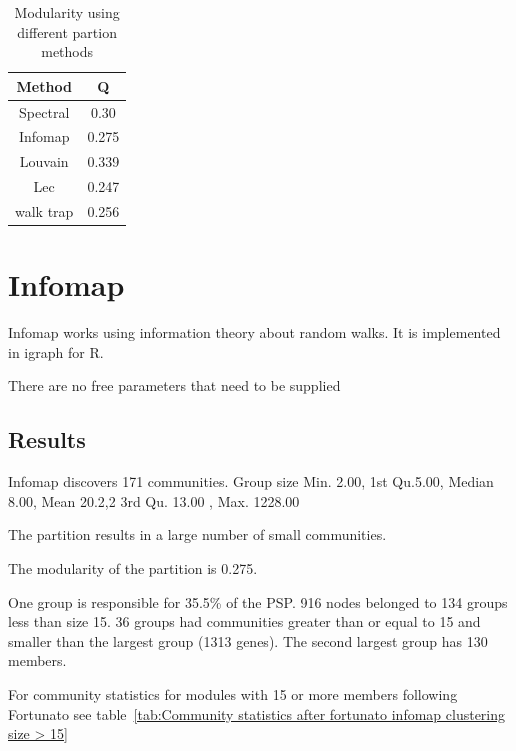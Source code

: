 \begin{table}[]
    \centering
    \begin{tabular}{cc}
    \toprule
        Method & Q \\
        \midrule
        Spectral & 0.30\\
        Infomap & 0.275\\
        Louvain & 0.339\\
        Lec & 0.247\\
        walk trap & 0.256\\
        \bottomrule
    \end{tabular}
    \caption{Modularity using different partion methods}
    \label{tab:modularity}
\end{table}

\section{Infomap}

Infomap works using information theory about random walks. It is implemented in igraph for R. 

There are no free parameters that need to be supplied

\subsection{Results}

Infomap discovers 171 communities. Group size  Min. 2.00, 1st  Qu.5.00,   Median 8.00,     Mean 20.2,2 3rd Qu. 13.00 ,  Max. 1228.00

The partition results in a large number of small communities. 

The modularity of the partition is 0.275.

One group is responsible for 35.5\% of the PSP. 916 nodes belonged to 134 groups less than size 15. 36 groups had communities greater than or equal to 15 and smaller than the largest group (1313 genes). The second largest group has 130 members.  

For community statistics for modules with 15 or more members following Fortunato \cite{fortunato2016community} see table~\ref{tab:Community statistics after fortunato infomap clustering size > 15}

